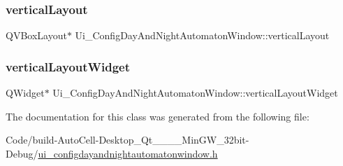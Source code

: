 \subsubsection{\texorpdfstring{vertical\+Layout}{verticalLayout}}
{\footnotesize\ttfamily Q\+V\+Box\+Layout$\ast$ Ui\+\_\+\+Config\+Day\+And\+Night\+Automaton\+Window\+::vertical\+Layout}

\mbox{\label{class_ui___config_day_and_night_automaton_window_a35db0f656f0cfc51ce1fdb6986f47d6b}} 
\subsubsection{\texorpdfstring{vertical\+Layout\+Widget}{verticalLayoutWidget}}
{\footnotesize\ttfamily Q\+Widget$\ast$ Ui\+\_\+\+Config\+Day\+And\+Night\+Automaton\+Window\+::vertical\+Layout\+Widget}



The documentation for this class was generated from the following file\+:\begin{DoxyCompactItemize}
\item 
Code/build-\/\+Auto\+Cell-\/\+Desktop\+\_\+\+Qt\+\_\+\_\+\_\+\_\+\+Min\+G\+W\+\_\+32bit-\/\+Debug/\mbox{\hyperlink{ui__configdayandnightautomatonwindow_8h}{ui\+\_\+configdayandnightautomatonwindow.\+h}}\end{DoxyCompactItemize}
